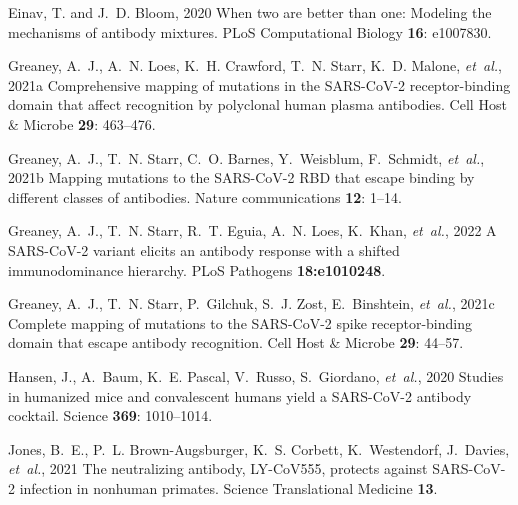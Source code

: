 \documentclass[9pt,twocolumn,twoside]{gsajnl_modified}
\begin{document}
{\begin{thebibliography}{30}
{Einav, T. {\rm and} J.~D. Bloom}, 2020 When two are better than one: Modeling
  the mechanisms of antibody mixtures. PLoS Computational Biology {\bf 16}:
  e1007830.

{Greaney, A.~J., A.~N. Loes, K.~H. Crawford, T.~N. Starr, K.~D. Malone, {\em
  et~al.\/}}, 2021{a} Comprehensive mapping of mutations in the {SARS-CoV-2}
  receptor-binding domain that affect recognition by polyclonal human plasma
  antibodies. Cell Host \& Microbe {\bf 29}: 463--476.

{Greaney, A.~J., T.~N. Starr, C.~O. Barnes, Y.~Weisblum, F.~Schmidt, {\em
  et~al.\/}}, 2021{b} Mapping mutations to the {SARS-CoV-2 RBD} that escape
  binding by different classes of antibodies. Nature communications {\bf 12}:
  1--14.

{Greaney, A.~J., T.~N. Starr, R.~T. Eguia, A.~N. Loes, K.~Khan, {\em
  et~al.\/}}, 2022 A {SARS-CoV-2} variant elicits an antibody response with a
  shifted immunodominance hierarchy. PLoS Pathogens {\bf 18:e1010248}.

{Greaney, A.~J., T.~N. Starr, P.~Gilchuk, S.~J. Zost, E.~Binshtein, {\em
  et~al.\/}}, 2021{c} Complete mapping of mutations to the {SARS-CoV-2} spike
  receptor-binding domain that escape antibody recognition. Cell Host \&
  Microbe {\bf 29}: 44--57.

{Hansen, J., A.~Baum, K.~E. Pascal, V.~Russo, S.~Giordano, {\em et~al.\/}},
  2020 Studies in humanized mice and convalescent humans yield a {SARS-CoV-2}
  antibody cocktail. Science {\bf 369}: 1010--1014.

{Jones, B.~E., P.~L. Brown-Augsburger, K.~S. Corbett, K.~Westendorf, J.~Davies,
  {\em et~al.\/}}, 2021 The neutralizing antibody, {LY-CoV555}, protects
  against {SARS-CoV-2} infection in nonhuman primates. Science Translational
  Medicine {\bf 13}.


\end{thebibliography}}
\end{document}
